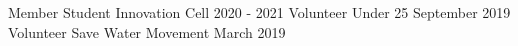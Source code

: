 


\begin{cvhonors}

%   
  \cvhonor
    {Member} %
    {Student Innovation Cell } %
    {2020 - 2021} %
    {} %
  \cvhonor
    {Volunteer} %
    {Under 25} %
    {September 2019} %
    {} %
  \cvhonor
    {Volunteer} %
    {Save Water Movement} %
    {March 2019} %
    {} %

\end{cvhonors}